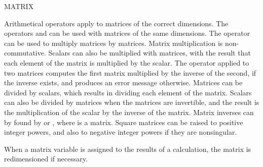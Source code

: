 \begin{Declaration}{MATRIX}
\begin{Comments}
Arithmetical operators apply to matrices of the correct dimensions.  The
operators \name{+} and \name{-} can be used with matrices of the same
dimensions.  The operator \name{*} can be used to multiply
 matrices by 
matrices.  Matrix multiplication is non-commutative.  Scalars can also be
multiplied with matrices, with the result that each element of the matrix
is multiplied by the scalar.  The operator \name{/} applied to two
matrices computes the first matrix multiplied by the inverse of the
second, if the inverse exists, and produces an error message otherwise.
Matrices can be divided by scalars, which results in dividing each element
of the matrix.  Scalars can also be divided by matrices when the matrices
are invertible, and the result is the multiplication of the scalar by the
inverse of the matrix.  Matrix inverses can by found by  or
, where  is a matrix.  Square matrices can be raised to
positive integer powers, and also to negative integer powers if they are
nonsingular.

When a matrix variable is assigned to the results of a calculation, the
matrix is redimensioned if necessary.
\end{Comments}
\end{Declaration}


